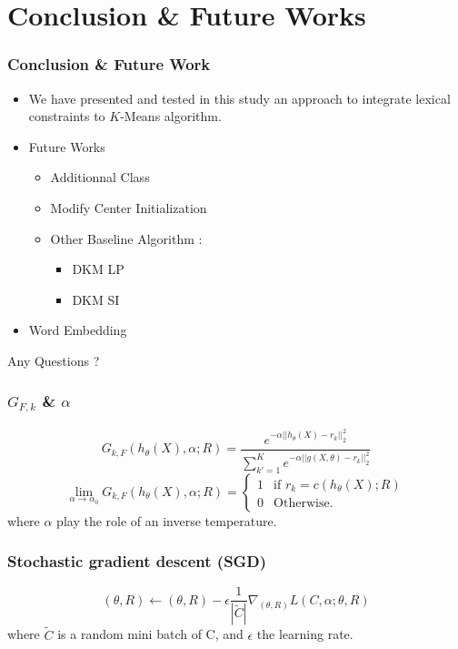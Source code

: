 \documentclass{beamer}
\begin{document}
\section{Conclusion \& Future Works}

\begin{frame}
  \frametitle{Conclusion \& Future Work}
\begin{itemize}
\item We have presented and tested in this study an approach to integrate lexical constraints to $K$-Means algorithm. \pause 
\item Future Works
\begin{itemize}
\item Additionnal Class
\item Modify Center Initialization
\item Other Baseline Algorithm :
  \begin{itemize}
  \item DKM LP
  \item DKM SI
  \end{itemize}
\end{itemize}
\item Word Embedding
\end{itemize}
\end{frame}

\begin{frame}
Any Questions ?
\end{frame}

\begin{frame}
\frametitle{$G_{F,k}$ \& $\alpha$}
\begin{equation*}
G_{k, F}(h_{\theta}(X), \alpha; R) = \frac{e^{-\alpha ||h_\theta(X) - r_k||_2^2}}
{\sum_{k' = 1}^K e^{-\alpha ||g(X, \theta) - r_k||_2^2}}
\end{equation*}
\begin{equation*}
  \lim\limits_{\alpha \rightarrow \alpha_0}G_{k, F}(h_\theta(X), \alpha; R) = \left\{
\begin{array}{ll}
  1 & \mbox{if }r_k = c(h_\theta(X); R)\\
  0 & \mbox{Otherwise.}
\end{array}
\right.
\end{equation*}
where $\alpha$ play the role of an inverse temperature.
\end{frame}

\begin{frame}
\frametitle{Stochastic gradient descent (SGD)}
\begin{equation*}
  (\theta, R) \gets (\theta, R) - \epsilon \frac{1}{|\widetilde{C}|}
  \nabla_{(\theta, R)} L(C, \alpha; \theta, R)
\end{equation*}
where $\widetilde{C}$ is a random mini batch of C, and $\epsilon$ the
learning rate.
\end{frame}
\end{document}
